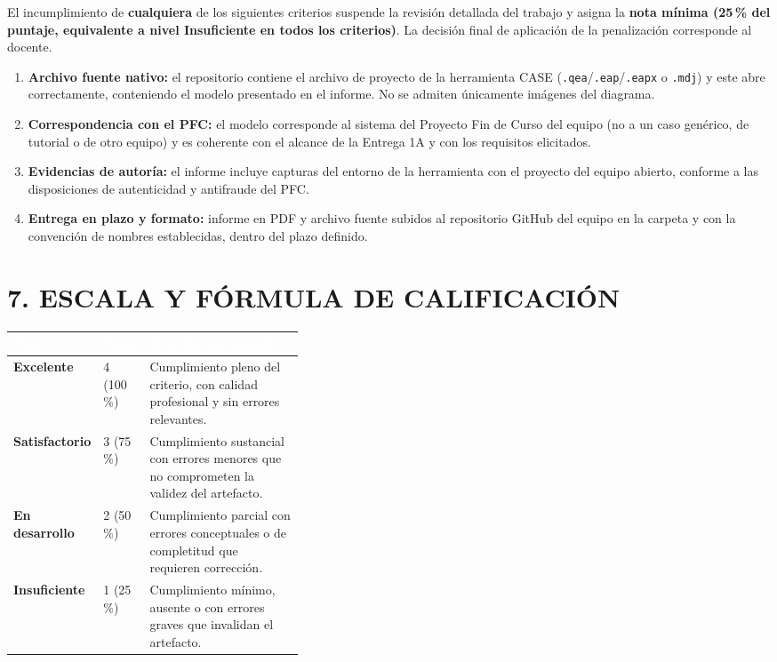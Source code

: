 \documentclass[11pt]{article}
\newcommand{\thdr}[1]{\cellcolor{utegreen}\textcolor{white}{\textbf{#1}}}
\begin{document}
\begin{tcolorbox}[colback=lightred,colframe=red!60!black,
  title=\textbf{CRITERIOS DE ADMISIÓN --- verificación previa a la revisión},
  fonttitle=\bfseries,boxrule=0.8pt,arc=2mm]
El incumplimiento de \textbf{cualquiera} de los siguientes criterios suspende la revisión detallada del trabajo y asigna la \textbf{nota mínima (25\,\% del puntaje, equivalente a nivel Insuficiente en todos los criterios)}. La decisión final de aplicación de la penalización corresponde al docente.
\begin{enumerate}[leftmargin=18pt,itemsep=2pt]
  \item \textbf{Archivo fuente nativo:} el repositorio contiene el archivo de proyecto de la herramienta CASE (\texttt{.qea}/\texttt{.eap}/\texttt{.eapx} o \texttt{.mdj}) y este abre correctamente, conteniendo el modelo presentado en el informe. No se admiten únicamente imágenes del diagrama.
  \item \textbf{Correspondencia con el PFC:} el modelo corresponde al sistema del Proyecto Fin de Curso del equipo (no a un caso genérico, de tutorial o de otro equipo) y es coherente con el alcance de la Entrega 1A y con los requisitos elicitados.
  \item \textbf{Evidencias de autoría:} el informe incluye capturas del entorno de la herramienta con el proyecto del equipo abierto, conforme a las disposiciones de autenticidad y antifraude del PFC.
  \item \textbf{Entrega en plazo y formato:} informe en PDF y archivo fuente subidos al repositorio GitHub del equipo en la carpeta y con la convención de nombres establecidas, dentro del plazo definido.
\end{enumerate}
\end{tcolorbox}

\section*{\textcolor{utegreendk}{7. ESCALA Y FÓRMULA DE CALIFICACIÓN}}

\noindent\begin{tabularx}{\linewidth}{|C{0.22\linewidth}|C{0.16\linewidth}|X|}
\hline
\thdr{Nivel} & \thdr{Valor} & \thdr{Descripción general}\\
\hline
{}\textbf{Excelente} & 4 (100\,\%) & Cumplimiento pleno del criterio, con calidad profesional y sin errores relevantes.\\
\hline
{}\textbf{Satisfactorio} & 3 (75\,\%) & Cumplimiento sustancial con errores menores que no comprometen la validez del artefacto.\\
\hline
{}\textbf{En desarrollo} & 2 (50\,\%) & Cumplimiento parcial con errores conceptuales o de completitud que requieren corrección.\\
\hline
{}\textbf{Insuficiente} & 1 (25\,\%) & Cumplimiento mínimo, ausente o con errores graves que invalidan el artefacto.\\
\hline
\end{tabularx}
\end{document}
